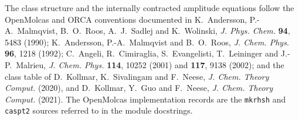 The class structure and the internally contracted amplitude equations
follow the OpenMolcas and ORCA conventions documented in
K.~Andersson, P.-A.~Malmqvist, B.~O.~Roos, A.~J.~Sadlej and
K.~Wolinski, \emph{J. Phys. Chem.} \textbf{94}, 5483 (1990);
K.~Andersson, P.-A.~Malmqvist and B.~O.~Roos,
\emph{J. Chem. Phys.} \textbf{96}, 1218 (1992);
C.~Angeli, R.~Cimiraglia, S.~Evangelisti, T.~Leininger and
J.-P.~Malrieu, \emph{J. Chem. Phys.} \textbf{114}, 10252 (2001) and
\textbf{117}, 9138 (2002); and the class table of
D.~Kollmar, K.~Sivalingam and F.~Neese,
\emph{J. Chem. Theory Comput.} (2020), and
D.~Kollmar, Y.~Guo and F.~Neese,
\emph{J. Chem. Theory Comput.} (2021).  The
OpenMolcas implementation records are the \texttt{mkrhsh} and
\texttt{caspt2} sources referred to in the module docstrings.
